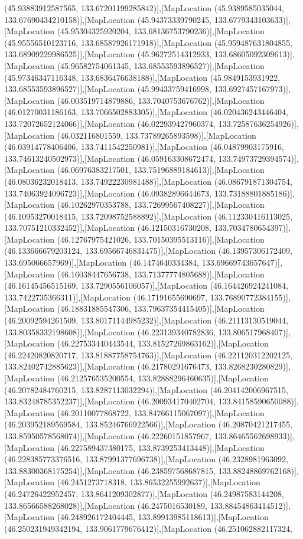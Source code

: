 (45.93883912587565, 133.67201199285842)],[MapLocation (45.9389585035044, 133.67690434210158)],[MapLocation (45.94373339790245, 133.6779343103633)],[MapLocation (45.95304325920204, 133.68136753790236)],[MapLocation (45.95556510123716, 133.68587926171918)],[MapLocation (45.959487631804855, 133.68909229986525)],[MapLocation (45.96272514312933, 133.68605092309613)],[MapLocation (45.96582754061345, 133.68553593896527)],[MapLocation (45.97346347116348, 133.6836476638188)],[MapLocation (45.9849153931922, 133.68553593896527)],[MapLocation (45.99433759416998, 133.6927457167973)],[MapLocation (46.003519714879886, 133.7040753676762)],[MapLocation (46.01270031186163, 133.7066502883305)],[MapLocation (46.020436243446404, 133.72072652124066)],[MapLocation (46.022939427960374, 133.72587636254926)],[MapLocation (46.032116801559, 133.73789265893598)],[MapLocation (46.03914778406406, 133.7411542250981)],[MapLocation (46.04879903175916, 133.74613240502973)],[MapLocation (46.059163308672474, 133.74973729394574)],[MapLocation (46.06976383217501, 133.75196889184613)],[MapLocation (46.08036232018413, 133.74922230981488)],[MapLocation (46.086791871304754, 133.74063924096723)],[MapLocation (46.09382896644673, 133.73188801885186)],[MapLocation (46.10262970353788, 133.72699567408227)],[MapLocation (46.10953270018415, 133.72098752588892)],[MapLocation (46.112330416113025, 133.70751210332452)],[MapLocation (46.12150316730208, 133.7034780654397)],[MapLocation (46.12767975421026, 133.70150395513116)],[MapLocation (46.133666679203124, 133.69566746831475)],[MapLocation (46.13957306172409, 133.695066657969)],[MapLocation (46.1474640334384, 133.69669743657647)],[MapLocation (46.16038447656738, 133.71377774805688)],[MapLocation (46.16145456515169, 133.7290556106057)],[MapLocation (46.164426924241084, 133.7422735366311)],[MapLocation (46.17191655690697, 133.76890772384155)],[MapLocation (46.18831885547306, 133.79637354415405)],[MapLocation (46.20092594261509, 133.80171144985232)],[MapLocation (46.21113130519044, 133.80358332198608)],[MapLocation (46.223139340782836, 133.806517968407)],[MapLocation (46.227533440443544, 133.81527269863162)],[MapLocation (46.22420820820717, 133.81887758754763)],[MapLocation (46.221120312202125, 133.82402742885623)],[MapLocation (46.21780291676473, 133.8268230280829)],[MapLocation (46.212576535200554, 133.82888296460635)],[MapLocation (46.20782484760215, 133.8287113032294)],[MapLocation (46.204142006967515, 133.83248785352237)],[MapLocation (46.200934170402704, 133.84158590650088)],[MapLocation (46.20110077868722, 133.84766115067097)],[MapLocation (46.203952189569584, 133.85246766922566)],[MapLocation (46.20870421217455, 133.85950578568074)],[MapLocation (46.22260151857967, 133.86465562698933)],[MapLocation (46.227589437380175, 133.8739253413448)],[MapLocation (46.228385773376516, 133.87991377696738)],[MapLocation (46.2328981963092, 133.88300368175254)],[MapLocation (46.238597568687815, 133.88248869762168)],[MapLocation (46.2451273718318, 133.86532255992637)],[MapLocation (46.24726422952457, 133.8641209302877)],[MapLocation (46.24987583144208, 133.86566588268028)],[MapLocation (46.2475016530189, 133.88454863414512)],[MapLocation (46.248926172404445, 133.89913985118613)],[MapLocation (46.250231949342194, 133.9061779676412)],[MapLocation (46.251062882117324, 